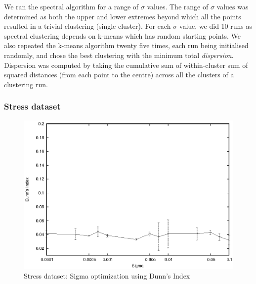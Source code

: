 We ran the spectral algorithm for a range of $\sigma$ values. The range of $\sigma$ values was determined as both the upper and lower extremes beyond which all the points 
resulted in a trivial clustering (single cluster).  For each $\sigma$ value, we did 10 runs as spectral clustering depends on k-means which has random starting points. 
We also repeated the k-means algorithm twenty five times, each run being initialised randomly, and chose the best clustering with the minimum total \textit{dispersion}. Dispersion was computed by taking the cumulative sum of within-cluster sum of squared distances (from each point to the centre) across all the clusters of a clustering run.  

\subsubsection{Stress dataset}

\begin{figure}[p]
 \centering
 \includegraphics[scale=1.0]{images_only/semisup/results/plots/stress_dunn.eps}
 \caption{Stress dataset: Sigma optimization using Dunn's Index}
 \label{fig:stress_sigma_opt_dunn}
\end{figure}

